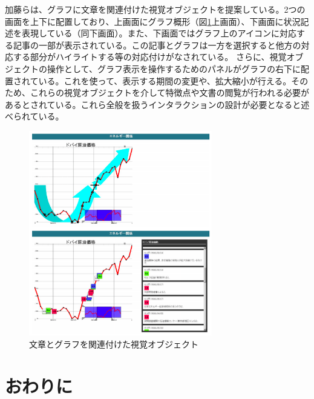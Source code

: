 \documentclass{matsushita-zemi}
\begin{document}
加藤らは、グラフに文章を関連付けた視覚オブジェクトを提案している。2つの画面を上下に配置しており、上画面にグラフ概形（図\ref{oblject}上画面）、下画面に状況記述を表現している（同下画面）。また、下画面ではグラフ上のアイコンに対応する記事の一部が表示されている。この記事とグラフは一方を選択すると他方の対応する部分がハイライトする等の対応付けがなされている。
さらに、視覚オブジェクトの操作として、グラフ表示を操作するためのパネルがグラフの右下に配置されている。これを使って、表示する期間の変更や、拡大縮小が行える。そのため、これらの視覚オブジェクトを介して特徴点や文書の閲覧が行われる必要があるとされている。これら全般を扱うインタラクションの設計が必要となると述べられている。
\begin{figure}[tb]
  \begin{center}
   \includegraphics[width=8cm,bb=0 0 507 566]{object.PNG}
  \end{center}
 \caption{文章とグラフを関連付けた視覚オブジェクト}
 \label{oblject}
\end{figure}


\section{おわりに}
\end{document}
